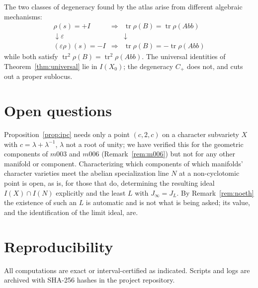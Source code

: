 \documentclass[11pt,a4paper]{article}
\theoremstyle{definition}
\theoremstyle{remark}
\newcommand{\tr}{\operatorname{tr}}
\begin{document}
The two classes of degeneracy found by the atlas arise from different
algebraic mechanisms:
\begin{equation}
\begin{array}{ccc}
\rho(s) = +I & \Longrightarrow & \tr\rho(B) = \tr\rho(Abb) \\[1mm]
\downarrow \varepsilon & & \downarrow \\[1mm]
(\varepsilon\rho)(s) = -I & \Longrightarrow & \tr\rho(B) = -\tr\rho(Abb)
\end{array}
\end{equation}
while both satisfy $\tr^2\rho(B) = \tr^2\rho(Abb)$. The universal
identities of Theorem~\ref{thm:universal} lie in $I(X_0)$; the
degeneracy $C_+$ does not, and cuts out a proper sublocus.

\section{Open questions}

Proposition~\ref{prop:ipc} needs only a point $(c,2,c)$ on a character
subvariety $X$ with $c=\lambda+\lambda^{-1}$, $\lambda$ not a root of
unity; we have verified this for the geometric components of $m003$
and $m006$ (Remark~\ref{rem:m006}) but not for any other manifold or
component. Characterizing which components of which manifolds'
character varieties meet the abelian specialization line $N$ at a
non-cyclotomic point is open, as is, for those that do, determining the
resulting ideal $I(X)\cap I(N)$ explicitly and the least $L$ with
$J_\infty=J_L$. By Remark~\ref{rem:noeth} the existence of such an $L$
is automatic and is not what is being asked; its value, and the
identification of the limit ideal, are.

\section{Reproducibility}
\label{sec:repro}

All computations are exact or interval-certified as indicated.
Scripts and logs are archived with SHA-256 hashes in the project
repository.
\end{document}
